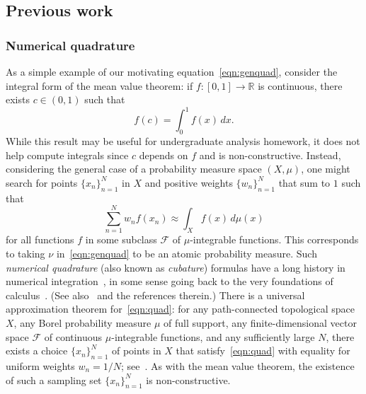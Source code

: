 \documentclass[12pt]{article}
\theoremstyle{plain}
\theoremstyle{definition}
\theoremstyle{remark}
\newcommand{\cF}{\mathcal{F}}
\newcommand{\bR}{\mathbb{R}}
\newcommand{\rar}{\rightarrow}
\begin{document}
\subsection{Previous work}
\subsubsection{Numerical quadrature}
As a simple example of our motivating equation~\eqref{eqn:genquad}, consider the integral form of the mean value theorem: if $f\colon [0,1] \rar \bR$ is continuous, there exists $c \in (0,1)$ such that 
\[
f(c) = \int_0^1 f(x)\, dx.
\]
While this result may be useful for undergraduate analysis homework, it does not help compute integrals since $c$ depends on $f$ and is non-constructive.
Instead, considering the general case of a probability measure space $(X,\mu)$, one might search for points $\{x_n\}_{n=1}^N$ in $X$ and positive weights $\{w_n\}_{n=1}^N$ that sum to $1$ such that 
\begin{equation}\label{eqn:quad}
    \sum_{n=1}^N w_n f(x_n) \approx \int_X f(x) \, d\mu(x)
\end{equation}
for all functions $f$ in some subclass $\mathcal{F}$ of $\mu$-integrable functions.
This corresponds to taking $\nu$ in~\eqref{eqn:genquad} to be an atomic probability measure.
Such \textit{numerical quadrature} (also known as \textit{cubature}) formulas have a long history in numerical integration~\cite{Radon:48}, in some sense going back to the very foundations of calculus~\cite{Newton:36}. 
(See also~\cite{deLaHarpeP:05} and the references therein.)
There is a universal approximation theorem for~\eqref{eqn:quad}:
for any path-connected topological space $X$, any Borel probability measure $\mu$ of full support, any finite-dimensional vector space $\cF$ of continuous $\mu$-integrable functions, and any sufficiently large $N$, there exists a choice $\{x_n\}_{n=1}^N$ of points in $X$ that satisfy~\eqref{eqn:quad} with equality for uniform weights $w_n = 1/N$; see~\cite{SeymourZ:84}. 
As with the mean value theorem, the existence of such a sampling set $\{x_n\}_{n=1}^N$ is non-constructive.
\end{document}
